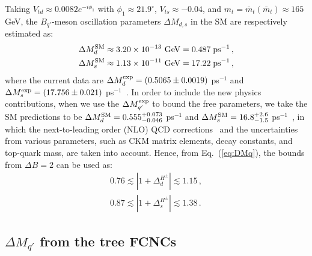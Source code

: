 \documentclass[prd,preprint,superscriptaddress,amsmath,amssymb]{revtex4}
\begin{document}
 
 
 Taking $V_{td} \approx 0.0082 e^{- i \phi_1}$ with $\phi_1 \approx 21.9^{\circ}$, $V_{ts} \approx -0.04$, and $m_t= \bar m_t (\bar m_t) \approx 165$ GeV, the $B_{q'}$-meson oscillation parameters $\Delta M_{d,s}$ in the SM are respectively estimated as:
 \begin{align}
 \Delta M^{\rm SM}_d &  \approx 3.20\times 10^{-13}\ \text{GeV} = 0.487\; {\rm ps}^{-1} \,, \nonumber \\
 \Delta M^{\rm SM}_s & \approx  1.13 \times 10^{-11}\ \text{GeV} = 17.22\; {\rm ps}^{-1}\,, 
 \end{align}
where the current data are $\Delta M^{\rm exp}_d = (0.5065 \pm 0.0019)$ ps$^{-1}$ and $\Delta M^{\rm exp}_s = (17.756 \pm 0.021)$ ps$^{-1}$~\cite{PDG}.  In order to include the new physics contributions, when we use the $\Delta M^{\rm exp}_{q'}$ to bound the free parameters, we take the SM predictions to be $\Delta M^{\rm SM}_d= 0.555^{+0.073}_{-0.046}$ ps$^{-1}$ and $\Delta M^{\rm SM}_s=16.8^{+2.6}_{-1.5}$ ps$^{-1}$~\cite{Lenz:2010gu}, in which the next-to-leading order (NLO) QCD corrections~\cite{Buras:1990fn,Ciuchini:1997bw,Buras:2000if} and the uncertainties from various parameters, such as CKM matrix elements, decay constants, and top-quark mass, are taken into account.  Hence, from Eq.~(\ref{eq:DMq}), the bounds from $\Delta B=2$ can be used as:
 \begin{align}
 0.76 \lesssim |1+ \Delta^{H^\pm}_d | \lesssim 1.15 \,, \nonumber \\
 0.87 \lesssim |1+ \Delta^{H^\pm}_s | \lesssim 1.38 \,. \label{eq:DB2_CH}
 \end{align}


\subsection{ $\Delta M_{q'}$ from the tree FCNCs }
\end{document}
